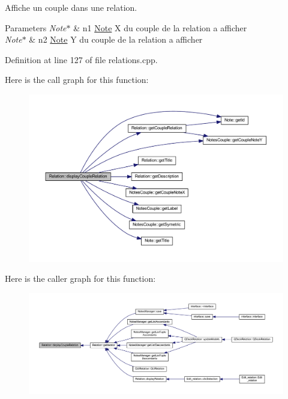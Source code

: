 Affiche un couple dans une relation. 


\begin{DoxyParams}{Parameters}
{\em Note$\ast$} & n1 \hyperlink{class_note}{Note} X du couple de la relation a afficher \\
\hline
{\em Note$\ast$} & n2 \hyperlink{class_note}{Note} Y du couple de la relation a afficher \\
\hline
\end{DoxyParams}


Definition at line 127 of file relations.\+cpp.

Here is the call graph for this function\+:\nopagebreak
\begin{figure}[H]
\begin{center}
\leavevmode
\includegraphics[width=350pt]{class_relation_aa6974a453611dee90f2ca2da9fe30de6_cgraph}
\end{center}
\end{figure}
Here is the caller graph for this function\+:\nopagebreak
\begin{figure}[H]
\begin{center}
\leavevmode
\includegraphics[width=350pt]{class_relation_aa6974a453611dee90f2ca2da9fe30de6_icgraph}
\end{center}
\end{figure}
\mbox{\label{class_relation_a086c39ecf396e3cfcb465fd9eea5a904}} 
